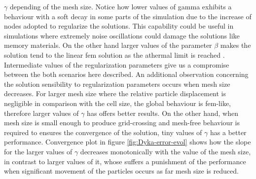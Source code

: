 \documentclass[preprint,12pt,a4paper]{elsarticle}
\begin{document}
$\gamma$ depending of the mesh size. Notice how lower values of
gamma exhibits a behaviour with a soft decay in some parts of the
simulation due to the increase of nodes adopted to regularize the
solutions. This capability could be useful in simulations where
extremely noise oscillations could damage the solutions like memory
materials. On the other hand larger values of the parameter $\beta$
makes the solution tend to the linear \acrshort{fem} solution as the athermal
limit is reached \cite{Arroyo2006}. Intermediate values of the
regularization parameters give us a compromise between the both
scenarios here described. An additional observation concerning the
solution sensibility to regularization parameters occurs when mesh
size decreases. For larger mesh size where the relative particle displacement
is negligible in comparison with the cell size, the global behaviour
is \acrshort{fem}-like, therefore larger values of $\gamma$ has offers better
results. On the other hand, when mesh size is small enough to produce
grid-crossing and mesh-free behaviour is required to ensures the
convergence of the solution, tiny values of $\gamma$ has a better
performance. Convergence plot in figure \eqref{fig:Dyka-error-evol}
shows how the slope for the larger values of $\gamma$ decreases
monotonically with the value of the mesh size, in contrast to larger
values of it, whose suffers a punishment of the performance when significant
movement of the particles occurs as far mesh size is reduced.  
\end{document}
